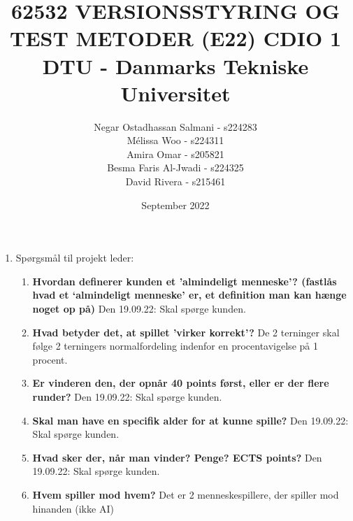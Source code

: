 \documentclass[12 pt]{article}
\title{\small 62532 VERSIONSSTYRING OG TEST METODER (E22) \vskip 5pt
	\huge{\textbf{CDIO 1} \vskip 5pt
		\small DTU - Danmarks Tekniske Universitet}}
\author{Negar Ostadhassan Salmani - s224283\\ 
	Mélissa Woo - s224311\\
	Amira Omar - s205821 \\
	Besma Faris Al-Jwadi - s224325 \\
	David Rivera - s215461}
\date{September 2022}
\begin{document}
	
	\maketitle
	\newpage
	\begin{enumerate}
		\item 	Spørgsmål til projekt leder:
		\begin{enumerate}
			\item \textbf{Hvordan definerer kunden et 'almindeligt menneske'? (fastlås hvad et ‘almindeligt menneske’ er, et definition man kan hænge noget op på)} \vskip 1pt
			Den 19.09.22: Skal spørge kunden.
			
			\item \textbf{Hvad betyder det, at spillet 'virker korrekt'?} \vskip 1pt
			De 2 terninger skal følge 2 terningers normalfordeling indenfor en procentavigelse på 1 procent. 
			
			\item \textbf{Er vinderen den, der opnår 40 points først, eller er der flere runder?} \vskip 1pt
			Den 19.09.22: Skal spørge kunden.
			
			\item \textbf{Skal man have en specifik alder for at kunne spille?} \vskip 1pt
			Den 19.09.22: Skal spørge kunden.

			\item \textbf{Hvad sker der, når man vinder? Penge? ECTS points?} \vskip 1pt
			Den 19.09.22: Skal spørge kunden.
			
			\item \textbf{Hvem spiller mod hvem?} \vskip 1pt
			Det er 2 menneskespillere, der spiller mod hinanden (ikke AI)
		\end{enumerate}
	\end{enumerate}
	
	
\end{document}
